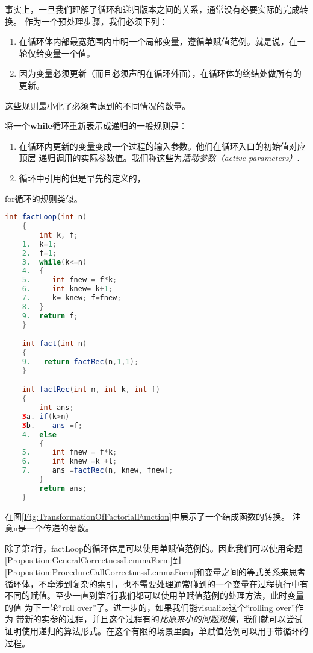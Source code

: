 事实上，一旦我们理解了循环和递归版本之间的关系，通常没有必要实际的完成转换。
作为一个预处理步骤，我们必须下列：
\begin{enumerate}
\item 在循环体内部最宽范围内申明一个局部变量，遵循单赋值范例。就是说，在一轮仅给变量一个值。
\item 因为变量必须更新（而且必须声明在循环外面），在循环体的终结处做所有的更新。
\end{enumerate}
这些规则最小化了必须考虑到的不同情况的数量。

将一个\textbf{while}循环重新表示成递归的一般规则是：
\begin{enumerate}
\item 在循环内更新的变量变成一个过程的输入参数。他们在循环入口的初始值对应顶层
    递归调用的实际参数值。我们称这些为\emph{活动参数（active parameters）}.
\item 循环中引用的但是早先的定义的，
\end{enumerate}
for循环的规则类似。

\begin{figure*}[!t]
    \centering
    \begin{lstlisting}[language={Java}, keywordstyle=\color{blue!70}, commentstyle=\color{red!50!green!50!blue!50}]
    int factLoop(int n)
    {
        int k, f;
    1.  k=1;
    2.  f=1;
    3.  while(k<=n)
    4.  {
    5.     int fnew = f*k;
    6.     int knew= k+1;
    7.     k= knew; f=fnew;
    8.  }
    9.  return f;
    }

    int fact(int n)
    {
    9.   return factRec(n,1,1);
    }

    int factRec(int n, int k, int f)
    {
        int ans;
    3a. if(k>n)
    3b.    ans =f;
    4.  else
        {
    5.     int fnew = f*k;
    6.     int knew =k +l;
    7.     ans =factRec(n, knew, fnew);
        }
        return ans;
    }
    \end{lstlisting}
    \caption{while循环转换成递归函数。与转换不相关的花括号省略了。}
    \label{Fig:TransformationOfFactorialFunction}
\end{figure*}

在图\ref{Fig:TransformationOfFactorialFunction}中展示了一个结成函数的转换。
注意n是一个传递的参数。

除了第7行，factLoop的循环体是可以使用单赋值范例的。因此我们可以使用命题
\ref{Proposition:GeneralCorrectnessLemmaForm}到
\ref{Proposition:ProcedureCallCorrectnessLemmaForm}和变量之间的等式关系来思考
循环体，不牵涉到复杂的索引，也不需要处理通常碰到的一个变量在过程执行中有
不同的赋值。至少一直到第7行我们都可以使用单赋值范例的处理方法，此时变量的值
为下一轮“roll over”了。进一步的，如果我们能visualize这个“rolling over”作为
带新的实参的过程，并且这个过程有的\emph{比原来小的问题规模}，我们就可以尝试
证明使用递归的算法形式。在这个有限的场景里面，单赋值范例可以用于带循环的过程。

